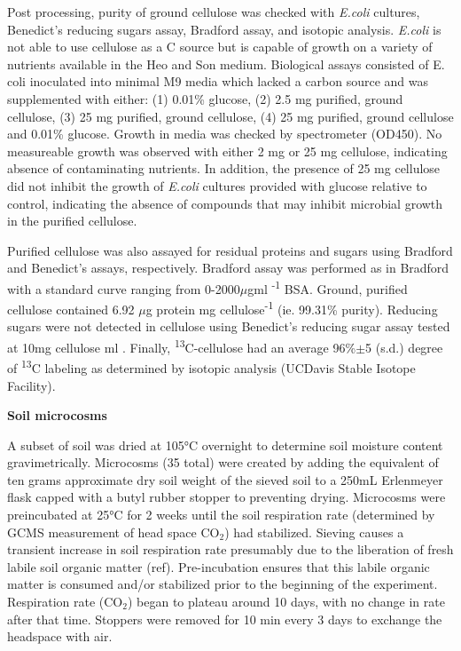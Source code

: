 Post processing, purity of ground cellulose was checked with \textit{E.coli} cultures, Benedict's reducing sugars assay, Bradford assay, and isotopic analysis. \textit{E.coli} is not able to use cellulose as a C source but is capable of growth on a variety of nutrients available in the Heo and Son medium.  Biological assays consisted of E. coli inoculated into minimal M9 media which lacked a carbon source and was supplemented with either: (1) 0.01\% glucose, (2) 2.5 mg purified, ground cellulose, (3) 25 mg purified, ground cellulose, (4) 25 mg purified, ground cellulose and 0.01\% glucose. Growth in media was checked by spectrometer (OD450). No measureable growth was observed with either 2 mg or 25 mg cellulose, indicating absence of contaminating nutrients. In addition, the presence of 25 mg cellulose did not inhibit the growth of \textit{E.coli} cultures provided with glucose relative to control, indicating the absence of compounds that may inhibit microbial growth in the purified cellulose. 

Purified cellulose was also assayed for residual proteins and sugars using Bradford and Benedict's assays, respectively. Bradford assay was performed as in Bradford \cite{Bradford_1976} with a standard curve ranging from 0-2000$\mu$gml \textsuperscript{-1} BSA. Ground, purified cellulose contained 6.92 $\mu$g protein mg cellulose\textsuperscript{-1} (ie. 99.31\% purity). Reducing sugars were not detected in cellulose using Benedict's reducing sugar assay \cite{benedict1909reagent} tested at 10mg cellulose ml . Finally, \textsuperscript{13}C-cellulose had an average 96\%$\pm$5 (s.d.) degree of \textsuperscript{13}C labeling as determined by isotopic analysis (UCDavis Stable Isotope Facility).           

\textbf{Soil microcosms}

A subset of soil was dried at 105°C overnight to determine soil moisture content gravimetrically. Microcosms (35 total) were created by adding the equivalent of ten grams approximate dry soil weight of the sieved soil to a 250mL Erlenmeyer flask capped with a butyl rubber stopper to preventing drying. Microcosms were preincubated at 25°C for 2 weeks until the soil respiration rate (determined by GCMS measurement of head space CO$_{2}$) had stabilized. Sieving causes a transient increase in soil respiration rate presumably due to the liberation of fresh labile soil organic matter (ref). Pre-incubation ensures that this labile organic matter is consumed and/or stabilized prior to the beginning of the experiment. Respiration rate (CO$_{2}$) began to plateau around 10 days, with no change in rate after that time. Stoppers were removed for 10 min every 3 days to exchange the headspace with air. 

